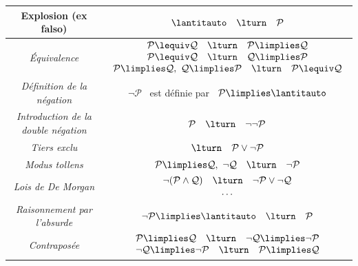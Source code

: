 \documentclass[11pt,class=report,crop=false]{standalone}
\begin{document}
\begin{center}
\begin{tabular}{|c|c|}
		\textbf{Explosion (ex falso)} 
		& $\lantitauto \quad \lturn \quad \mathcal{P}$ \\ \hline
		
		\emph{Équivalence} 
		& $\begin{array}{c}
			\mathcal{P}\lequiv\mathcal{Q} \quad \lturn \quad \mathcal{P}\limplies\mathcal{Q} \\
			\mathcal{P}\lequiv\mathcal{Q} \quad \lturn \quad \mathcal{Q}\limplies\mathcal{P} \\
			\mathcal{P}\limplies\mathcal{Q},\ \mathcal{Q}\limplies\mathcal{P} \quad \lturn \quad \mathcal{P}\lequiv\mathcal{Q}
		\end{array}$ \\ \hline
		
		\emph{Définition de la négation} 
		& $\lnot\mathcal{P}$ \ est définie par \ $\mathcal{P}\limplies\lantitauto$ \\ \hline
		
		\emph{Introduction de la double négation}
		& $\mathcal{P} \quad \lturn \quad \lnot\lnot\mathcal{P}$ \\ \hline
		
		\emph{Tiers exclu} 
		& $\lturn \quad \mathcal{P}\lor\lnot\mathcal{P}$ \\ \hline
		
		\emph{Modus tollens} 
		& $\mathcal{P}\limplies\mathcal{Q},\ \lnot\mathcal{Q} \quad \lturn \quad \lnot\mathcal{P}$ \\ \hline
		
		\emph{Lois de De Morgan} 
		& $\begin{array}{c}
			\lnot(\mathcal{P}\land\mathcal{Q}) \quad \lturn \quad \lnot\mathcal{P}\lor\lnot\mathcal{Q} \\
			\ldots		
		\end{array}$\\ \hline
		
		\emph{Raisonnement par l'absurde} 
		& $\lnot\mathcal{P}\limplies\lantitauto \quad \lturn \quad \mathcal{P}$ \\ \hline
		
		\emph{Contraposée} 
		& $\begin{array}{c}		
			\mathcal{P}\limplies\mathcal{Q} \quad \lturn \quad \lnot\mathcal{Q}\limplies\lnot\mathcal{P} \\ 
			\lnot\mathcal{Q}\limplies\lnot\mathcal{P} \quad \lturn \quad \mathcal{P}\limplies\mathcal{Q} \\ 		
		\end{array}$\\\hline
	\end{tabular}
\end{center}
\end{document}
